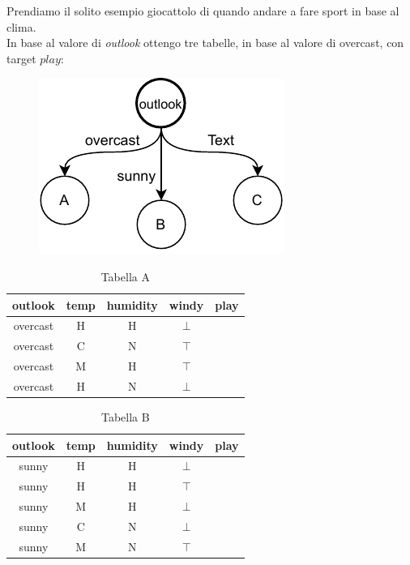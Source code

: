\documentclass[a4paper,12pt, oneside]{book}
\begin{document}
\begin{esempio}
  Prendiamo il solito esempio giocattolo di quando andare a fare sport in base
  al clima.\\
  In base al valore di \textit{outlook} ottengo tre tabelle, in base al valore
  di overcast, con target $play$:
  \begin{figure}[H]
    \centering
    \includegraphics[scale = 0.9]{img/dt2.pdf}
  \end{figure}
  \begin{table}[H]
    \centering
    \begin{tabular}{c|c|c|c|c}
      outlook & temp & humidity & windy & play\\
      \hline
      overcast & H & H & $\bot$ & \color{darkgreen}{yes}\\
      overcast & C & N & $\top$ & \color{darkgreen}{yes}\\
      overcast & M & H & $\top$ & \color{darkgreen}{yes}\\
      overcast & H & N & $\bot$ & \color{darkgreen}{yes}
    \end{tabular}
    \caption{Tabella A}
  \end{table}
  \begin{table}[H]
    \centering
    \begin{tabular}{c|c|c|c|c}
      outlook & temp & humidity & windy & play\\
      \hline
      sunny & H & H & $\bot$ & \color{red}{no}\\
      sunny & H & H & $\top$ & \color{red}{no}\\
      sunny & M & H & $\bot$ & \color{red}{no}\\
      sunny & C & N & $\bot$ & \color{darkgreen}{yes}\\
      sunny & M & N & $\top$ & \color{darkgreen}{yes}
    \end{tabular}
    \caption{Tabella B}
  \end{table}
  \begin{table}[H]

\end{table}
\end{esempio}
\end{document}
